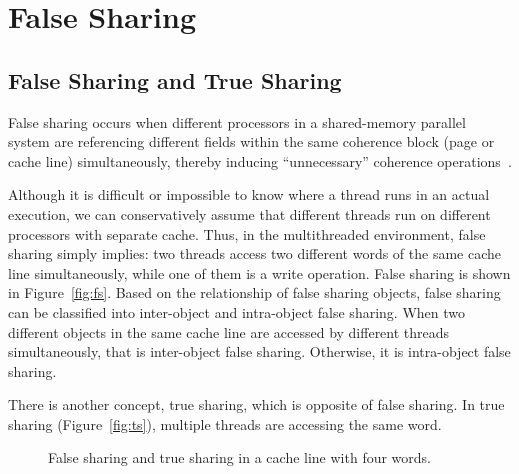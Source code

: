 \section{False Sharing}

\subsection{False Sharing and True Sharing}
False sharing occurs when different processors in a shared-memory parallel system are referencing different fields within the same coherence block (page or cache line) simultaneously, thereby inducing ``unnecessary'' coherence operations~\cite{Bolosky:1993:FSE:1295480.1295483}. 

Although it is difficult or impossible to know where a thread runs in an actual execution, we can conservatively assume that different threads run on different processors with separate cache. Thus, in the multithreaded environment, false sharing simply implies: two threads access two different words of the same cache line simultaneously, while one of them is a write operation. False sharing is shown in Figure~\ref{fig:fs}. 
Based on the relationship of false sharing objects, 
false sharing can be classified into inter-object and intra-object false sharing. When two different objects in the same cache line are accessed by different threads simultaneously, that is inter-object false sharing. Otherwise, it is intra-object false sharing. 

There is another concept, true sharing, which is opposite of false sharing. In true sharing (Figure~\ref{fig:ts}), multiple threads are accessing the same word. 

\begin{figure}
\begin{center} 
%
\hspace{50pt}
%
\end{center}
\caption{False sharing and true sharing in a cache line with four words. }
\label{fig:fsexample}
\end{figure}

